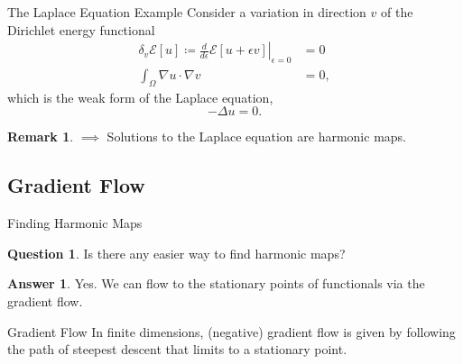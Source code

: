 \documentclass[usenames,dvipsnames]{beamer}
\theoremstyle{definition}
\newtheorem*{remark}{Remark}
\newtheorem*{question}{Question}
\newtheorem*{answer}{Answer}
\theoremstyle{theorem}
\begin{document}
\begin{frame}{The Laplace Equation Example}
        Consider a variation in direction $v$ of the Dirichlet energy functional
        \begin{align*}
        \delta_v \mathcal{E}[u] \coloneqq \left.\frac{d}{d\epsilon} \mathcal{E}[u+\epsilon v]\right|_{\epsilon=0}&=0 \\
        \int_\Omega \nabla u \cdot \nabla v&= 0,
        \end{align*}
        which is the weak form of the Laplace equation,
        \[
        -\Delta u = 0.
        \]
        \begin{remark}
        $\implies$ Solutions to the Laplace equation are harmonic maps.
        \end{remark}
        \end{frame}
        
    \subsection{Gradient Flow}
     
        \begin{frame}{Finding Harmonic Maps}
            \begin{question}
                Is there any easier way to find harmonic maps?
            \end{question}
            \pause
            \begin{answer}
                Yes.  We can flow to the stationary points of functionals via the gradient flow.
            \end{answer}
        \end{frame}
        
\begin{frame}{Gradient Flow}
        In finite dimensions, (negative) gradient flow is given by following the path of steepest descent that limits to a stationary point.
        \end{frame}
        
        
    
        
\end{document}
